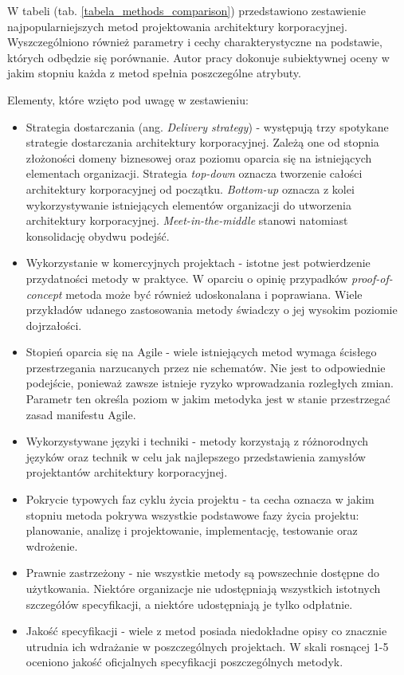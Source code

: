 W tabeli (tab. \ref{tabela_methods_comparison}) przedstawiono zestawienie najpopularniejszych metod projektowania architektury korporacyjnej. Wyszczególniono również parametry i cechy charakterystyczne na podstawie, których odbędzie się porównanie. Autor pracy dokonuje subiektywnej oceny w jakim stopniu każda z metod spełnia poszczególne atrybuty.

Elementy, które wzięto pod uwagę w zestawieniu:
\begin{itemize}
\item{Strategia dostarczania (ang. \emph{Delivery strategy}) - występują trzy spotykane strategie dostarczania architektury korporacyjnej. Zależą one od stopnia złożoności domeny biznesowej oraz poziomu oparcia się na istniejących elementach organizacji. Strategia \emph{top-down} oznacza tworzenie całości architektury korporacyjnej od początku. \emph{Bottom-up} oznacza z kolei wykorzystywanie istniejących elementów organizacji do utworzenia architektury korporacyjnej. \emph{Meet-in-the-middle} stanowi natomiast konsolidację obydwu podejść. }
\item{Wykorzystanie w komercyjnych projektach - istotne jest potwierdzenie przydatności metody w praktyce. W oparciu o opinię przypadków \emph{proof-of-concept} metoda może być również udoskonalana i poprawiana. Wiele przykładów udanego zastosowania metody świadczy o jej wysokim poziomie dojrzałości.}
\item{Stopień oparcia się na Agile - wiele istniejących metod wymaga ścisłego przestrzegania narzucanych przez nie schematów. Nie jest to odpowiednie podejście, ponieważ zawsze istnieje ryzyko wprowadzania rozległych zmian. Parametr ten określa poziom w jakim metodyka jest w stanie przestrzegać zasad manifestu Agile.}
\item{Wykorzystywane języki i techniki - metody korzystają z różnorodnych języków oraz technik w celu jak najlepszego przedstawienia zamysłów projektantów architektury korporacyjnej.}
\item{Pokrycie typowych faz cyklu życia projektu - ta cecha oznacza w jakim stopniu metoda pokrywa wszystkie podstawowe fazy życia projektu: planowanie, analizę i projektowanie, implementację, testowanie oraz wdrożenie.}
\item{Prawnie zastrzeżony - nie wszystkie metody są powszechnie dostępne do użytkowania. Niektóre organizacje nie udostępniają wszystkich istotnych szczegółów specyfikacji, a niektóre udostępniają je tylko odpłatnie.}
\item{Jakość specyfikacji - wiele z metod posiada niedokładne opisy co znacznie utrudnia ich wdrażanie w poszczególnych projektach. W skali rosnącej 1-5 oceniono jakość oficjalnych specyfikacji poszczególnych metodyk. }

\end{itemize}
